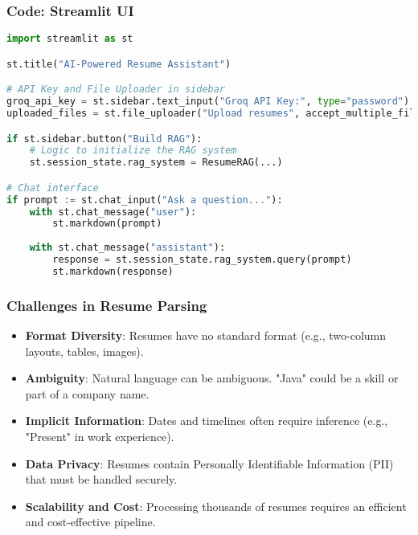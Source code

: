 \begin{frame}[fragile]\frametitle{Code: Streamlit UI}
    \begin{lstlisting}[language=Python, basicstyle=\tiny, caption={streamlit\_main.py}]
import streamlit as st

st.title("AI-Powered Resume Assistant")

# API Key and File Uploader in sidebar
groq_api_key = st.sidebar.text_input("Groq API Key:", type="password")
uploaded_files = st.file_uploader("Upload resumes", accept_multiple_files=True)

if st.sidebar.button("Build RAG"):
    # Logic to initialize the RAG system
    st.session_state.rag_system = ResumeRAG(...)

# Chat interface
if prompt := st.chat_input("Ask a question..."):
    with st.chat_message("user"):
        st.markdown(prompt)
    
    with st.chat_message("assistant"):
        response = st.session_state.rag_system.query(prompt)
        st.markdown(response)
    \end{lstlisting}
\end{frame}

\begin{frame}[fragile]\frametitle{Challenges in Resume Parsing}
    \begin{itemize}
        \item \textbf{Format Diversity}: Resumes have no standard format (e.g., two-column layouts, tables, images).
        \item \textbf{Ambiguity}: Natural language can be ambiguous. "Java" could be a skill or part of a company name.
        \item \textbf{Implicit Information}: Dates and timelines often require inference (e.g., "Present" in work experience).
        \item \textbf{Data Privacy}: Resumes contain Personally Identifiable Information (PII) that must be handled securely.
        \item \textbf{Scalability and Cost}: Processing thousands of resumes requires an efficient and cost-effective pipeline.
    \end{itemize}
\end{frame}

